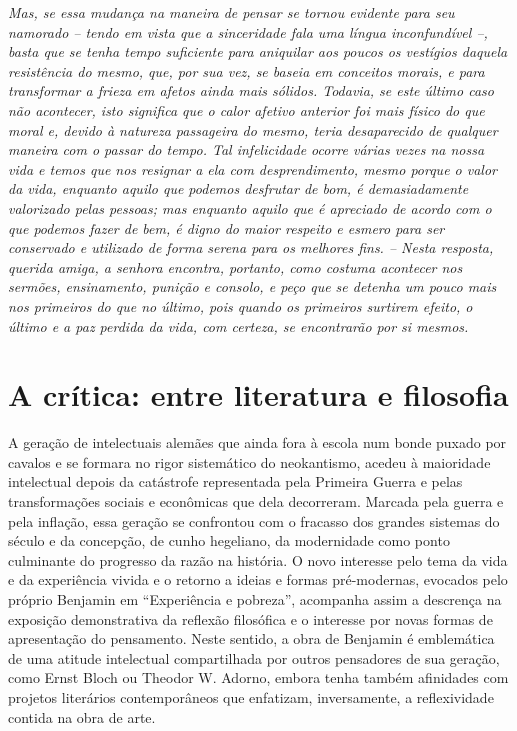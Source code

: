 \emph{Mas, se essa mudança na maneira de pensar se tornou evidente para
seu namorado -- tendo em vista que a sinceridade fala uma língua
inconfundível --, basta que se tenha tempo suficiente para aniquilar aos
poucos os vestígios daquela resistência do mesmo, que, por sua vez, se
baseia em conceitos morais, e para transformar a frieza em afetos ainda
mais sólidos. Todavia, se este último caso não acontecer, isto significa
que o calor afetivo anterior foi mais físico do que moral e, devido à
natureza passageira do mesmo, teria desaparecido de qualquer maneira com
o passar do tempo. Tal infelicidade ocorre várias vezes na nossa vida e
temos que nos resignar a ela com desprendimento, mesmo porque o valor da
vida, enquanto aquilo que podemos desfrutar de bom, é demasiadamente
valorizado pelas pessoas; mas enquanto aquilo que é apreciado de acordo
com o que podemos fazer de bem, é digno do maior respeito e esmero para
ser conservado e utilizado de forma serena para os melhores fins. --
Nesta resposta, querida amiga, a senhora encontra, portanto, como
costuma acontecer nos sermões, ensinamento, punição e consolo, e peço
que se detenha um pouco mais nos primeiros do que no último, pois quando
os primeiros surtirem efeito, o último e a paz perdida da vida, com
certeza, se encontrarão por si mesmos.}


\section{A crítica: entre literatura e filosofia}

A geração de intelectuais alemães que ainda fora à escola num bonde
puxado por cavalos e se formara no rigor sistemático do neokantismo,
acedeu à maioridade intelectual depois da catástrofe representada pela
Primeira Guerra e pelas transformações sociais e econômicas que dela
decorreram. Marcada pela guerra e pela inflação, essa geração se
confrontou com o fracasso dos grandes sistemas do século  e da
concepção, de cunho hegeliano, da modernidade como ponto culminante do
progresso da razão na história. O novo interesse pelo tema da vida e da
experiência vivida e o retorno a ideias e formas pré-modernas, evocados
pelo próprio Benjamin em ``Experiência e pobreza'', acompanha assim a
descrença na exposição demonstrativa da reflexão filosófica e o
interesse por novas formas de apresentação do pensamento. Neste sentido,
a obra de Benjamin é emblemática de uma atitude intelectual
compartilhada por outros pensadores de sua geração, como Ernst Bloch ou
Theodor W. Adorno, embora tenha também afinidades com projetos
literários contemporâneos que enfatizam, inversamente, a reflexividade
contida na obra de arte.

